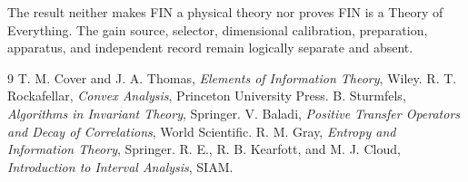 \documentclass[11pt,a4paper]{article}
\begin{document}
The result neither makes FIN a physical theory nor proves FIN is a Theory of Everything.
The gain source, selector, dimensional calibration, preparation, apparatus, and
independent record remain logically separate and absent.

\begin{thebibliography}{9}
 T. M. Cover and J. A. Thomas, \emph{Elements of Information Theory}, Wiley.
 R. T. Rockafellar, \emph{Convex Analysis}, Princeton University Press.
 B. Sturmfels, \emph{Algorithms in Invariant Theory}, Springer.
 V. Baladi, \emph{Positive Transfer Operators and Decay of Correlations}, World Scientific.
 R. M. Gray, \emph{Entropy and Information Theory}, Springer.
 R. E., R. B. Kearfott, and M. J. Cloud, \emph{Introduction to Interval Analysis}, SIAM.
\end{thebibliography}
\end{document}

